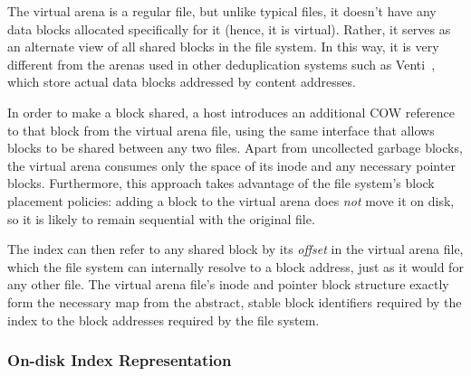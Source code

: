 The virtual arena is a regular file, but unlike typical files, it
doesn't have any data blocks allocated specifically for it (hence, it
is virtual).  Rather, it serves as an alternate view of all shared
blocks in the file
system.  In this way, it is very different from the arenas used in
other deduplication systems such as Venti~\cite{quinlan02venti}, which
store actual data blocks addressed by content addresses.

In order to make a block shared, a host introduces an additional COW
reference to that block from the virtual arena file, using the same
interface that allows blocks to be shared between any two
files.  Apart from uncollected garbage blocks, the virtual arena
consumes only the space of its inode and any necessary pointer
blocks.  Furthermore, this approach takes advantage of the file
system's block placement policies: adding a block to the virtual arena
does \emph{not} move
it on disk, so it is likely to remain sequential with the original
file.

The index can then refer to any shared block by its \emph{offset} in
the virtual arena file, which the file system can internally resolve
to a block address, just as it would for any other file.  The virtual
arena file's inode and pointer block structure exactly form the
necessary map from the abstract, stable block identifiers required by
the index to the block addresses required by the file system.

\subsubsection{On-disk Index Representation}
\label{sec:index:representation}

